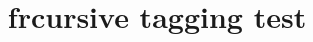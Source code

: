 \documentclass{article}
\title{frcursive tagging test}
\begin{document}
\kant[1-2]
\begin{calseries}
\kant[3]
\end{calseries}
\begin{ftseries}
\kant[4]
\end{ftseries}
\begin{wideseries}
\kant[5]
\end{wideseries}
\begin{acadshape}
\kant[6]
\end{acadshape}
\end{document}
